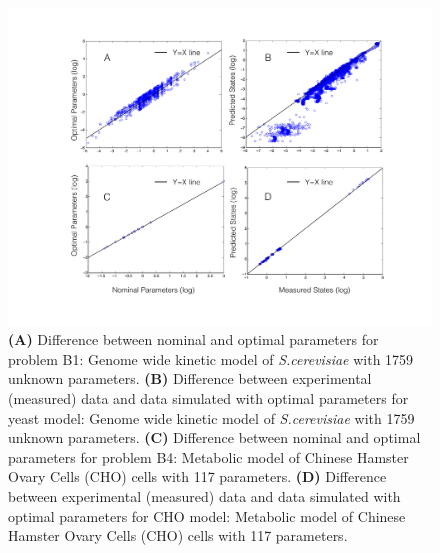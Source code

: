 \documentclass[12pt]{article}
\begin{document}
\begin{figure}[ht]
\centering
\includegraphics[width=1.00\textwidth]{./figs/Figure_S3_B1_B4_params_measuredstates.pdf}
\caption{ \textbf {(A)} Difference between nominal and optimal parameters for problem B1: Genome wide kinetic model of \textit{S.cerevisiae} with 1759 unknown parameters. \textbf {(B)} Difference between experimental (measured) data and data simulated with optimal parameters for yeast model: Genome wide kinetic model of \textit{S.cerevisiae} with 1759 unknown parameters. \textbf {(C)} Difference between nominal and optimal parameters for problem B4: Metabolic model of Chinese  Hamster Ovary Cells (CHO) cells with 117 parameters. \textbf {(D)} Difference between experimental (measured) data and data simulated with optimal parameters for CHO model: Metabolic model of Chinese  Hamster Ovary Cells (CHO) cells with 117 parameters.
}\label{fig-benchmark}
\end{figure}
\end{document}
